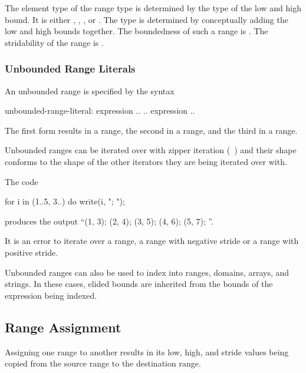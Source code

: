 The element type of the range type is determined by the type of the
low and high bound.  It is either , ,
, or .  The type is determined by
conceptually adding the low and high bounds together.  The boundedness
of such a range is .  The stridability of
the range is .

\subsubsection{Unbounded Range Literals}
\label{Unbounded_Ranges}

An unbounded range is specified by the syntax
\begin{syntax}
unbounded-range-literal:
  expression ..
  .. expression
  ..
\end{syntax}

The first form results in a  range, the
second in a  range, and the third in
a  range.

Unbounded ranges can be iterated over with zipper iteration
(~) and their shape conforms to the shape of the
other iterators they are being iterated over with.
\begin{example}
The code
\begin{chapel}
for i in (1..5, 3..) do
  write(i, "; ");
\end{chapel}
produces the output ``(1, 3); (2, 4); (3, 5); (4, 6); (5, 7); ''.
\end{example}

It is an error to iterate over a  range,
a  range with negative stride or a
 range with positive stride.

Unbounded ranges can also be used to index into ranges, domains,
arrays, and strings.  In these cases, elided bounds are inherited
from the bounds of the expression being indexed.


\subsection{Range Assignment}
\label{Range_Assignment}

Assigning one range to another results in its low, high, and stride
values being copied from the source range to the destination range.

